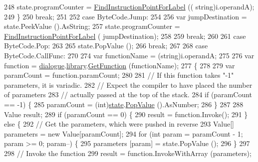 \begin{DoxyCode}
248                     state.programCounter = \hyperlink{a00156_af613c8b2d098678b6ea05b509c0a0cb6}{FindInstructionPointForLabel} ((\textcolor{keywordtype}{
      string})i.operandA);
249                 \}
250                 \textcolor{keywordflow}{break};
251 
252             \textcolor{keywordflow}{case} ByteCode.Jump:
254 
256                 var jumpDestination = state.PeekValue ().AsString;
257                 state.programCounter = \hyperlink{a00156_af613c8b2d098678b6ea05b509c0a0cb6}{FindInstructionPointForLabel} (
      jumpDestination);
258 
259                 \textcolor{keywordflow}{break};
260 
261             \textcolor{keywordflow}{case} ByteCode.Pop:
263 
265                 state.PopValue ();
266                 \textcolor{keywordflow}{break};
267 
268             \textcolor{keywordflow}{case} ByteCode.CallFunc:
270 
274                 var functionName = (string)i.operandA;
275 
276                 var \textcolor{keyword}{function} = \hyperlink{a00156_ac506426c503da5f033247c29e11c5e82}{dialogue}.\hyperlink{a00086_ae660d4cfb6e296358d2f61d8ee74c66a}{library}.\hyperlink{a00123_aacfb1f00ad8aa3921941b8d8af0960e0}{GetFunction} (functionName);
277                 \{
278 
279                     var paramCount = function.paramCount;
280 
281                     \textcolor{comment}{// If this function takes "-1" parameters, it is variadic.}
282                     \textcolor{comment}{// Expect the compiler to have placed the number of parameters}
283                     \textcolor{comment}{// actually passed at the top of the stack.}
284                     \textcolor{keywordflow}{if} (paramCount == -1) \{
285                         paramCount = (int)\hyperlink{a00156_a70f2ce6201cdd2430ceaa764ac614ca0}{state}.\hyperlink{a00159_a36881a888ea2839d74c3d4e7c199f4ee}{PopValue} ().AsNumber;
286                     \}
287 
288                     Value result;
289                     \textcolor{keywordflow}{if} (paramCount == 0) \{
290                         result = function.Invoke();
291                     \} \textcolor{keywordflow}{else} \{
292                         \textcolor{comment}{// Get the parameters, which were pushed in reverse}
293                         Value[] parameters = \textcolor{keyword}{new} Value[paramCount];
294                         \textcolor{keywordflow}{for} (\textcolor{keywordtype}{int} param = paramCount - 1; param >= 0; param--) \{
295                             parameters [param] = state.PopValue ();
296                         \}
297 
298                         \textcolor{comment}{// Invoke the function}
299                         result = function.InvokeWithArray (parameters);

\end{DoxyCode}
